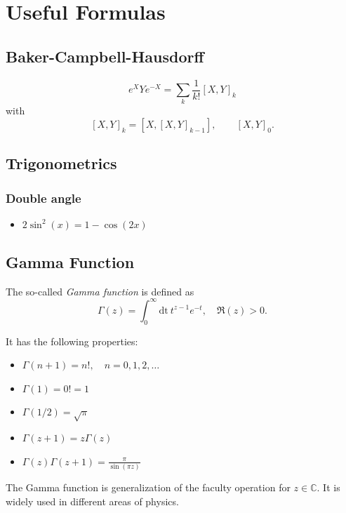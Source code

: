 \documentclass[11pt]{book}
\newcommand{\comm}[2]{\left[#1,#2\right]}
\begin{document}
\setlength\parindent{0pt}

\chapter{Useful Formulas}

\section{Baker-Campbell-Hausdorff}

\begin{equation}
  e^{X} Y e^{-X} = \sum_k \dfrac{1}{k!} \comm{X}{Y}_k
\end{equation}
with \[\comm{X}{Y}_k = \comm{X}{\comm{X}{Y}_{k-1}},\quad\quad
\comm{X}{Y}_0.\]


\section{Trigonometrics}

\subsection{Double angle}

\begin{itemize}
  \item $ 2\sin^2(x) = 1 - \cos(2x) $ 
\end{itemize}


\section{Gamma Function}

The so-called \textit{Gamma function} is defined as 
\begin{equation}
  \Gamma(z) = \int_0^{\infty} \text{dt}\: t^{z-1} e^{-t}, \quad \Re(z) > 0.
\end{equation}

It has the following properties:
\begin{itemize}
  \item $ \Gamma(n+1) = n!, \quad n= 0, 1, 2, \dots $ 
  \item $ \Gamma(1) = 0! = 1 $ 
  \item $ \Gamma(1/2) = \sqrt{\pi} $ 
  \item $ \Gamma(z+1) = z \Gamma(z) $ 
  \item $ \Gamma(z)\Gamma(z+1) = \frac{\pi}{\sin(\pi z)} $ 
\end{itemize}
The Gamma function is generalization of the faculty operation for $ z \in \mathbb{C} $. It is widely used in different areas of physics.
\end{document}
